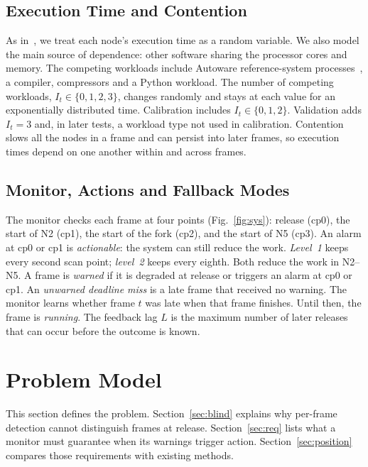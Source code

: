 \documentclass[acmsmall,screen]{acmart}
\begin{document}
\subsection{Execution Time and Contention}

As in~\cite{toba2024,toba2026}, we treat each node's execution time as a random variable. We also model the main source of dependence: other software sharing the processor cores and memory. The competing workloads include Autoware reference-system processes~\cite{refsystem}, a compiler, compressors and a Python workload. The number of competing workloads, $I_t\in\{0,1,2,3\}$, changes randomly and stays at each value for an exponentially distributed time. Calibration includes $I_t\in\{0,1,2\}$. Validation adds $I_t=3$ and, in later tests, a workload type not used in calibration. Contention slows all the nodes in a frame and can persist into later frames, so execution times depend on one another within and across frames.

\subsection{Monitor, Actions and Fallback Modes}

The monitor checks each frame at four points (Fig.~\ref{fig:sys}): release (cp0), the start of N2 (cp1), the start of the fork (cp2), and the start of N5 (cp3). An alarm at cp0 or cp1 is \emph{actionable}: the system can still reduce the work. \emph{Level~1} keeps every second scan point; \emph{level~2} keeps every eighth. Both reduce the work in N2--N5. A frame is \emph{warned} if it is degraded at release or triggers an alarm at cp0 or cp1. An \emph{unwarned deadline miss} is a late frame that received no warning. The monitor learns whether frame $t$ was late when that frame finishes. Until then, the frame is \emph{running}. The feedback lag $L$ is the maximum number of later releases that can occur before the outcome is known.

\section{Problem Model}\label{sec:problem}

This section defines the problem. Section~\ref{sec:blind} explains why per-frame detection cannot distinguish frames at release. Section~\ref{sec:req} lists what a monitor must guarantee when its warnings trigger action. Section~\ref{sec:position} compares those requirements with existing methods.
\end{document}
